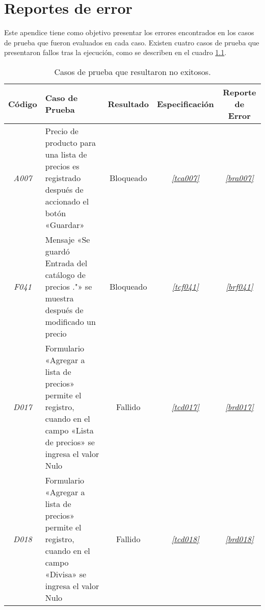 \chapter{Reportes de error}\label{appendix_bugreport}
Este apendice tiene como objetivo presentar los errores encontrados en los casos
de prueba que fueron evaluados en cada caso. Existen cuatro casos de prueba que
presentaron fallos tras la ejecución, como se describen en el cuadro
\ref{bugs}.

\begin{table}[H]
\centering
\begin{tabular}{|c|p{6.5cm}|c|c|c|}
\hline
\footnotesize{\textbf{Código}} & \footnotesize{\textbf{Caso de Prueba}} &
\footnotesize{\textbf{Resultado}} & \footnotesize{\textbf{Especificación}} &
\footnotesize{\textbf{Reporte de Error}} \\
\hline
\footnotesize{\emph{A007}} &
\footnotesize{Precio de producto para una lista de precios es registrado después
de accionado el botón «Guardar»} &
\footnotesize{Bloqueado} &
\footnotesize{\emph{\ref{tca007}}} &
\footnotesize{\emph{\ref{bra007}}}
\\
\footnotesize{\emph{F041}} &
\footnotesize{Mensaje «Se guardó Entrada del catálogo de precios ."» se muestra
después de modificado un precio} &
\footnotesize{Bloqueado} &
\footnotesize{\emph{\ref{tcf041}}} &
\footnotesize{\emph{\ref{brf041}}}
\\
\footnotesize{\emph{D017}} &
\footnotesize{Formulario «Agregar a lista de precios» permite el registro,
cuando en el campo «Lista de precios» se ingresa el valor Nulo} &
\footnotesize{Fallido} &
\footnotesize{\emph{\ref{tcd017}}} &
\footnotesize{\emph{\ref{brd017}}}
\\
\footnotesize{\emph{D018}} &
\footnotesize{Formulario «Agregar a lista de precios» permite el registro,
cuando en el campo «Divisa» se ingresa el valor Nulo} &
\footnotesize{Fallido} &
\footnotesize{\emph{\ref{tcd018}}} &
\footnotesize{\emph{\ref{brd018}}}
\\
\hline
\end{tabular}
\caption{Casos de prueba que resultaron no exitosos.}
\label{bugs}
\end{table}

